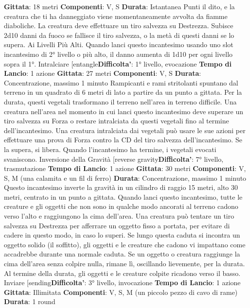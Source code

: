 \begin{multicols}{2}
\textbf{Gittata}: 18 metri
\textbf{Componenti}: V, S
\textbf{Durata}: Istantanea
Punti il dito, e la creatura che ti ha danneggiato viene
momentaneamente avvolta da fiamme diaboliche. La
creatura deve effettuare un tiro salvezza su Destrezza.
Subisce 2d10 danni da fuoco se fallisce il tiro salvezza,
o la metà di questi danni se lo supera.
Ai Livelli Più Alti. Quando lanci questo incantesimo
usando uno slot incantesimo di 2° livello o più alto, il
danno aumenta di 1d10 per ogni livello sopra il 1°.
Intralciare
[entangle\textbf{Difficolta'}:
1° livello, evocazione
\textbf{Tempo di Lancio}: 1 azione
\textbf{Gittata}: 27 metri
\textbf{Componenti}: V, S
\textbf{Durata}: Concentrazione, massimo 1 minuto
Rampicanti e rami stritolanti spuntano dal terreno in un
quadrato di 6 metri di lato a partire da un punto a
gittata. Per la durata, questi vegetali trasformano il
terreno nell’area in terreno difficile.
Una creatura nell’area nel momento in cui lanci questo
incantesimo deve superare un tiro salvezza su Forza o
restare intralciata da questi vegetali fino al termine
dell’incantesimo. Una creatura intralciata dai vegetali
può usare le sue azioni per effettuare una prova di
Forza contro la CD del tiro salvezza dell’incantesimo.
Se la supera, si libera.
Quando l’incantesimo ha termine, i vegetali evocati
svaniscono.
Inversione della Gravità
[reverse gravity\textbf{Difficolta'}:
7° livello, trasmutazione
\textbf{Tempo di Lancio}: 1 azione
\textbf{Gittata}: 30 metri
\textbf{Componenti}: V, S, M (una calamita e un fil di ferro)
\textbf{Durata}: Concentrazione, massimo 1 minuto
Questo incantesimo inverte la gravità in un cilindro di
raggio 15 metri, alto 30 metri, centrato in un punto a
gittata. Quando lanci questo incantesimo, tutte le
creature e gli oggetti che non sono in qualche modo
ancorati al terreno cadono verso l’alto e raggiungono la
cima dell’area. Una creatura può tentare un tiro
salvezza su Destrezza per afferrare un oggetto fisso a
portata, per evitare di cadere in questo modo, in caso lo
superi.
Se lungo questa caduta si incontra un oggetto solido (il
soffitto), gli oggetti e le creature che cadono vi
impattano come accadrebbe durante una normale
caduta. Se un oggetto o creatura raggiunge la cima
dell’area senza colpire nulla, rimane lì, oscillando
lievemente, per la durata.
Al termine della durata, gli oggetti e le creature colpite
ricadono verso il basso.
Inviare
[sending\textbf{Difficolta'}:
3° livello, invocazione
\textbf{Tempo di Lancio}: 1 azione
\textbf{Gittata}: Illimitata
\textbf{Componenti}: V, S, M (un piccolo pezzo di cavo di
rame)
\textbf{Durata}: 1 round

\end{multicols}
